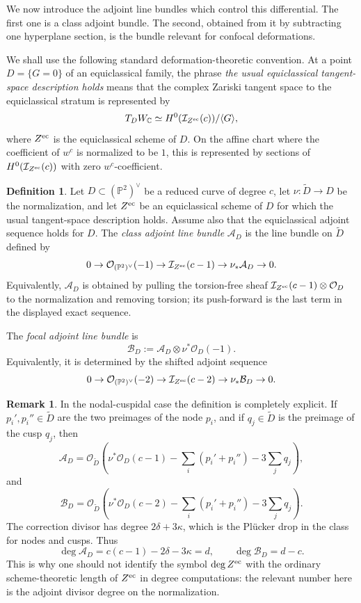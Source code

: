 \documentclass[11pt]{amsart}
\theoremstyle{definition}
\newtheorem{definition}[lemma]{Definition}
\newtheorem{remark}[lemma]{Remark}
\theoremstyle{remark}
\newcommand{\bP}{\mathbb{P}}
\newcommand{\A}{\mathcal{A}}
\newcommand{\B}{\mathcal{B}}
\begin{document}
We now introduce the adjoint line bundles which control this differential.  The first one is a class adjoint bundle.  The second, obtained from it by subtracting one hyperplane section, is the bundle relevant for confocal deformations.

We shall use the following standard deformation-theoretic convention.  At a point $D=\{G=0\}$ of an equiclassical family, the phrase \emph{the usual equiclassical tangent-space description holds} means that the complex Zariski tangent space to the equiclassical stratum is represented by
\[
T_DW_{\mathbb C}\simeq H^0(\mathcal I_{Z^{\rm ec}}(c))/\langle G\rangle,
\]
where $Z^{\rm ec}$ is the equiclassical scheme of $D$.  On the affine chart where the coefficient of $w^c$ is normalized to be $1$, this is represented by sections of $H^0(\mathcal I_{Z^{\rm ec}}(c))$ with zero $w^c$-coefficient.

\begin{definition}\label{def:class-adjoint-bundle}
Let $D\subset (\bP^2)^\vee$ be a reduced curve of degree $c$, let $\nu:\widetilde D\to D$ be the normalization, and let $Z^{\rm ec}$ be an equiclassical scheme of $D$ for which the usual tangent-space description holds. Assume also that the equiclassical adjoint sequence holds for $D$. The \emph{class adjoint line bundle} $\A_D$ is the line bundle on $\widetilde D$ defined by
\[
0\to \mathcal O_{(\bP^2)^\vee}(-1)
\to \mathcal I_{Z^{\rm ec}}(c-1)
\to \nu_*\A_D\to 0.
\]
Equivalently, $\A_D$ is obtained by pulling the torsion-free sheaf $\mathcal I_{Z^{\rm ec}}(c-1)\otimes \mathcal O_D$ to the normalization and removing torsion; its push-forward is the last term in the displayed exact sequence.

The \emph{focal adjoint line bundle} is
\[
\B_D:=\A_D\otimes \nu^*\mathcal O_D(-1).
\]
Equivalently, it is determined by the shifted adjoint sequence
\[
0\to \mathcal O_{(\bP^2)^\vee}(-2)
\to \mathcal I_{Z^{\rm ec}}(c-2)
\to \nu_*\B_D\to 0.
\]
\end{definition}

\begin{remark}\label{rem:nodal-cuspidal-adjoint}
In the nodal-cuspidal case the definition is completely explicit. If $p_i',p_i''\in \widetilde D$ are the two preimages of the node $p_i$, and if $q_j\in \widetilde D$ is the preimage of the cusp $q_j$, then
\[
\A_D=
\mathcal O_{\widetilde D}\left(
\nu^*\mathcal O_D(c-1)
-\sum_i(p_i'+p_i'')-3\sum_jq_j
\right),
\]
and
\[
\B_D=
\mathcal O_{\widetilde D}\left(
\nu^*\mathcal O_D(c-2)
-\sum_i(p_i'+p_i'')-3\sum_jq_j
\right).
\]
The correction divisor has degree $2\delta+3\kappa$, which is the Pl\"ucker drop in the class for nodes and cusps. Thus
\[
\deg \A_D=c(c-1)-2\delta-3\kappa=d,
\qquad
\deg \B_D=d-c.
\]
This is why one should not identify the symbol $\deg Z^{\rm ec}$ with the ordinary scheme-theoretic length of $Z^{\rm ec}$ in degree computations: the relevant number here is the adjoint divisor degree on the normalization.
\end{remark}
\end{document}
